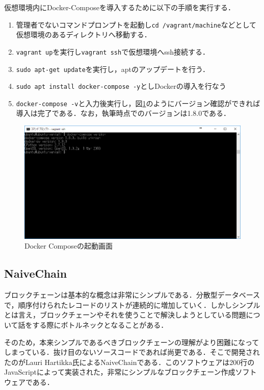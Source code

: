 仮想環境内にDocker-Composeを導入するために以下の手順を実行する．

\begin{enumerate}
\item 管理者でないコマンドプロンプトを起動し\texttt{cd /vagrant/machine}などとして仮想環境のあるディレクトリへ移動する．
\item \texttt{vagrant up}を実行し\texttt{vagrant ssh}で仮想環境へssh接続する．
\item \texttt{sudo apt-get update}を実行し，aptのアップデートを行う．
\item \texttt{sudo apt install docker-compose -y}としDockerの導入を行なう
\item \texttt{docker-compose -v}と入力後実行し，図\ref{docker-compose}のようにバージョン確認ができれば導入は完了である．なお，執筆時点でのバージョンは1.8.0である．
\end{enumerate}

\begin{figure}[htb]
\centering
\includegraphics[width=12cm]{images/docker-compose.png}
\caption{Docker Composeの起動画面}\label{docker-compose}
\end{figure}

\newpage

\subsection{NaiveChain}\label{addnaivechain}

ブロックチェーンは基本的な概念は非常にシンプルである．分散型データベースで，順序付けられたレコードのリストが連続的に増加していく．しかしシンプルとは言え，ブロックチェーンやそれを使うことで解決しようとしている問題について話をする際にボトルネックとなることがある．

そのため，本来シンプルであるべきブロックチェーンの理解がより困難になってしまっている．抜け目のないソースコードであれば尚更である．そこで開発されたのがLauri Hartikka氏によるNaiveChain\cite{naivechain}である．このソフトウェアは200行のJavaScriptによって実装された，非常にシンプルなブロックチェーン作成ソフトウェアである．

